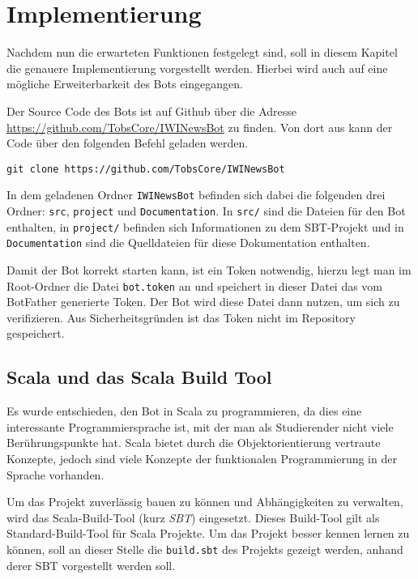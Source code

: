 \chapter{Implementierung}
Nachdem nun die erwarteten Funktionen festgelegt sind, soll in diesem Kapitel die genauere Implementierung vorgestellt werden. Hierbei wird auch auf eine mögliche Erweiterbarkeit des Bots eingegangen.

Der Source Code des Bots ist auf Github über die Adresse \url{https://github.com/TobsCore/IWINewsBot} zu finden. Von dort aus kann der Code über den folgenden Befehl geladen werden.

\begin{lstlisting}
git clone https://github.com/TobsCore/IWINewsBot
\end{lstlisting}

In dem geladenen Ordner \texttt{IWINewsBot} befinden sich dabei die folgenden drei Ordner: \texttt{src}, \texttt{project} und \texttt{Documentation}. In \texttt{src/} sind die Dateien für den Bot enthalten, in \texttt{project/} befinden sich Informationen zu dem SBT-Projekt und in \texttt{Documentation} sind die Quelldateien für diese Dokumentation enthalten.

Damit der Bot korrekt starten kann, ist ein Token notwendig, hierzu legt man im Root-Ordner die Datei \texttt{bot.token} an und speichert in dieser Datei das vom BotFather generierte Token. Der Bot wird diese Datei dann nutzen, um sich zu verifizieren. Aus Sicherheitsgründen ist das Token nicht im Repository gespeichert.

\section{Scala und das Scala Build Tool}
Es wurde entschieden, den Bot in Scala zu programmieren, da dies eine interessante Programmiersprache ist, mit der man als Studierender nicht viele Berührungspunkte hat. Scala bietet durch die Objektorientierung vertraute Konzepte, jedoch sind viele Konzepte der funktionalen Programmierung in der Sprache vorhanden.

Um das Projekt zuverlässig bauen zu können und Abhängigkeiten zu verwalten, wird das Scala-Build-Tool (kurz \emph{SBT}) eingesetzt. Dieses Build-Tool gilt als Standard-Build-Tool für Scala Projekte. Um das Projekt besser kennen lernen zu können, soll an dieser Stelle die \texttt{build.sbt} des Projekts gezeigt werden, anhand derer SBT vorgestellt werden soll.



